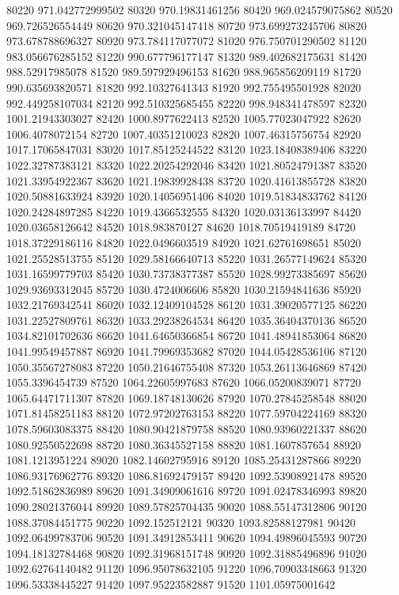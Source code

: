{80220 971.042772999502
80320 970.19831461256
80420 969.024579075862
80520 969.726526554449
80620 970.321045147418
80720 973.699273245706
80820 973.678788696327
80920 973.784117077072
81020 976.750701290502
81120 983.056676285152
81220 990.677796177147
81320 989.402682175631
81420 988.52917985078
81520 989.597929496153
81620 988.965856209119
81720 990.635693820571
81820 992.10327641343
81920 992.755495501928
82020 992.449258107034
82120 992.510325685455
82220 998.948341478597
82320 1001.21943303027
82420 1000.8977622413
82520 1005.77023047922
82620 1006.4078072154
82720 1007.40351210023
82820 1007.46315756754
82920 1017.17065847031
83020 1017.85125244522
83120 1023.18408389406
83220 1022.32787383121
83320 1022.20254292046
83420 1021.80524791387
83520 1021.33954922367
83620 1021.19839928438
83720 1020.41613855728
83820 1020.50881633924
83920 1020.14056951406
84020 1019.51834833762
84120 1020.24284897285
84220 1019.4366532555
84320 1020.03136133997
84420 1020.03658126642
84520 1018.983870127
84620 1018.70519419189
84720 1018.37229186116
84820 1022.0496603519
84920 1021.62761698651
85020 1021.25528513755
85120 1029.58166640713
85220 1031.26577149624
85320 1031.16599779703
85420 1030.73738377387
85520 1028.99273385697
85620 1029.93693312045
85720 1030.4724006606
85820 1030.21594841636
85920 1032.21769342541
86020 1032.12409104528
86120 1031.39020577125
86220 1031.22527809761
86320 1033.29238264534
86420 1035.36404370136
86520 1034.82101702636
86620 1041.64650366854
86720 1041.48941853064
86820 1041.99549457887
86920 1041.79969353682
87020 1044.05428536106
87120 1050.35567278083
87220 1050.21646755408
87320 1053.26113646869
87420 1055.3396454739
87520 1064.22605997683
87620 1066.05200839071
87720 1065.64471711307
87820 1069.18748130626
87920 1070.27845258548
88020 1071.81458251183
88120 1072.97202763153
88220 1077.59704224169
88320 1078.59603083375
88420 1080.90421879758
88520 1080.93960221337
88620 1080.92550522698
88720 1080.36345527158
88820 1081.1607857654
88920 1081.1213951224
89020 1082.14602795916
89120 1085.25431287866
89220 1086.93176962776
89320 1086.81692479157
89420 1092.53908921478
89520 1092.51862836989
89620 1091.34909061616
89720 1091.02478346993
89820 1090.28021376044
89920 1089.57825704435
90020 1088.55147312806
90120 1088.37084451775
90220 1092.152512121
90320 1093.82588127981
90420 1092.06499783706
90520 1091.34912853411
90620 1094.49896045593
90720 1094.18132784468
90820 1092.31968151748
90920 1092.31885496896
91020 1092.62764140482
91120 1096.95078632105
91220 1096.70903348663
91320 1096.53338445227
91420 1097.95223582887
91520 1101.05975001642
}
